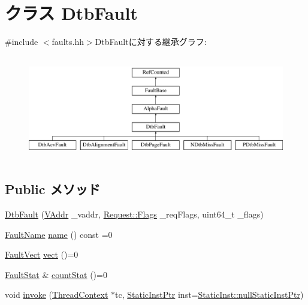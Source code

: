 \hypertarget{classAlphaISA_1_1DtbFault}{
\section{クラス DtbFault}
\label{classAlphaISA_1_1DtbFault}
}


{\ttfamily \#include $<$faults.hh$>$}DtbFaultに対する継承グラフ:\begin{figure}[H]
\begin{center}
\leavevmode
\includegraphics[height=4.59016cm]{classAlphaISA_1_1DtbFault}
\end{center}
\end{figure}
\subsection*{Public メソッド}
\begin{DoxyCompactItemize}
\item 
\hyperlink{classAlphaISA_1_1DtbFault_a74e89dcaff8c62058a1ecabdf3b0e641}{DtbFault} (\hyperlink{structAlphaISA_1_1VAddr}{VAddr} \_\-vaddr, \hyperlink{classFlags}{Request::Flags} \_\-reqFlags, uint64\_\-t \_\-flags)
\item 
\hyperlink{sim_2faults_8hh_abb196df64725e5c2568c900cf130d8d7}{FaultName} \hyperlink{classAlphaISA_1_1DtbFault_a09ac100f5ad40cf1726c4e60925c2522}{name} () const =0
\item 
\hyperlink{classm5_1_1params_1_1Addr}{FaultVect} \hyperlink{classAlphaISA_1_1DtbFault_ae7a41506fab06a3c1e392f5286f14c66}{vect} ()=0
\item 
\hyperlink{classStats_1_1Scalar}{FaultStat} \& \hyperlink{classAlphaISA_1_1DtbFault_a4b643982263b390349238a6711216763}{countStat} ()=0
\item 
void \hyperlink{classAlphaISA_1_1DtbFault_a2bd783b42262278d41157d428e1f8d6f}{invoke} (\hyperlink{classThreadContext}{ThreadContext} $\ast$tc, \hyperlink{classRefCountingPtr}{StaticInstPtr} inst=\hyperlink{classStaticInst_aa793d9793af735f09096369fb17567b6}{StaticInst::nullStaticInstPtr})
\end{DoxyCompactItemize}

